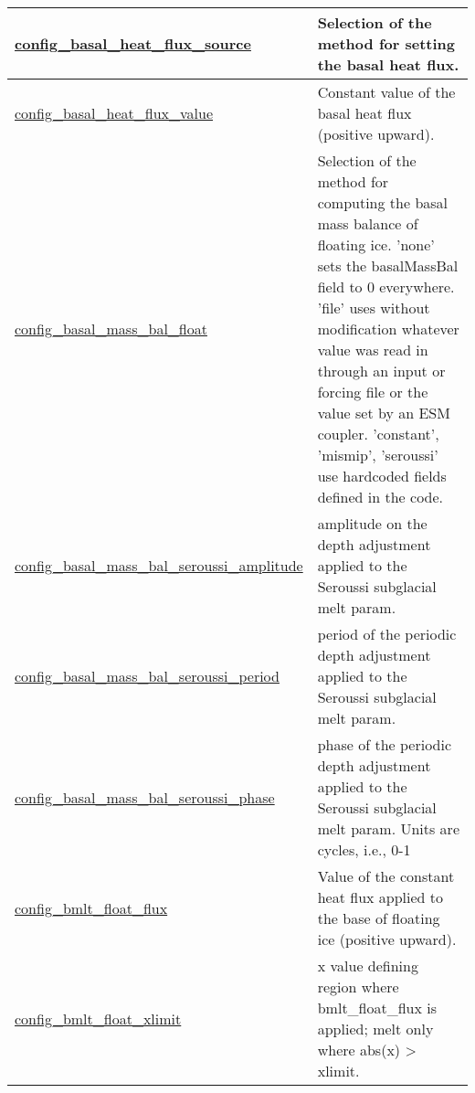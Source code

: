 {\begin{center}
\begin{longtable}{| p{2.0in} || p{4.0in} |}
    \hline
    \hyperref[subsec:nm_sec_config_basal_heat_flux_source]{config\_basal\_heat\_flux\_source} & Selection of the method for setting the basal heat flux. \\
    \hline
    \hyperref[subsec:nm_sec_config_basal_heat_flux_value]{config\_basal\_heat\_flux\_value} & Constant value of the basal heat flux (positive upward). \\
    \hline
    \hyperref[subsec:nm_sec_config_basal_mass_bal_float]{config\_basal\_mass\_bal\_float} & Selection of the method for computing the basal mass balance of floating ice.  'none' sets the basalMassBal field to 0 everywhere.  'file' uses without modification whatever value was read in through an input or forcing file or the value set by an ESM coupler.  'constant', 'mismip', 'seroussi' use hardcoded fields defined in the code. \\
    \hline
    \hyperref[subsec:nm_sec_config_basal_mass_bal_seroussi_amplitude]{config\_basal\_mass\_bal\_\-seroussi\_amplitude} & amplitude on the depth adjustment applied to the Seroussi subglacial melt param. \\
    \hline
    \hyperref[subsec:nm_sec_config_basal_mass_bal_seroussi_period]{config\_basal\_mass\_bal\_\-seroussi\_period} & period of the periodic depth adjustment applied to the Seroussi subglacial melt param. \\
    \hline
    \hyperref[subsec:nm_sec_config_basal_mass_bal_seroussi_phase]{config\_basal\_mass\_bal\_\-seroussi\_phase} & phase of the periodic depth adjustment applied to the Seroussi subglacial melt param. Units are cycles, i.e., 0-1 \\
    \hline
    \hyperref[subsec:nm_sec_config_bmlt_float_flux]{config\_bmlt\_float\_flux} & Value of the constant heat flux applied to the base of floating ice (positive upward). \\
    \hline
    \hyperref[subsec:nm_sec_config_bmlt_float_xlimit]{config\_bmlt\_float\_xlimit} & x value defining region where bmlt\_float\_flux is applied; melt only where abs(x) > xlimit. \\
    \hline
\end{longtable}
\end{center}
}
